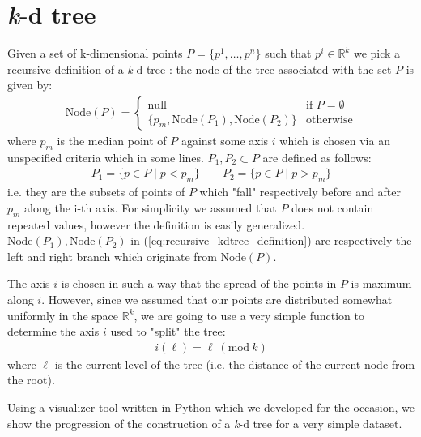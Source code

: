 \documentclass{article}
\newcommand{\kdtree}{\emph{k}-d tree}
\newcommand{\Mod}[1]{\ (\mathrm{mod}\ #1)}
\begin{document}
\section{\kdtree{}}
Given a set of k-dimensional points $P = \{p^1, \dots, p^n\}$ such that
$p^i \in \mathbb{R}^k$ we pick a recursive definition of a \kdtree{}
\cite{skrodzki2019kd}: the node of the tree associated with the set $P$ is given
by:
\begin{gather} \label{eq:recursive_kdtree_definition}
    \text{Node}(P) = \begin{cases}
        \text{null} &\text{if } P = \emptyset\\
        \{p_m, \text{Node}(P_1), \text{Node}(P_2)\} &\text{otherwise}
    \end{cases}
\end{gather}
where $p_m$ is the median point of $P$ against some axis $i$ which is chosen
via an unspecified criteria which in some lines. $P_1, P_2 \subset P$ are
defined as follows:
\begin{gather*}
    P_1 = \{p \in P \mid p < p_m\} \qquad P_2 = \{p \in P \mid p > p_m\}
\end{gather*}
i.e. they are the subsets of points of $P$ which "fall" respectively before
and after $p_m$ along the i-th axis. For simplicity we assumed that $P$ does not
contain repeated values, however the definition is easily generalized.
$\text{Node}(P_1), \text{Node}(P_2)$ in (\ref*{eq:recursive_kdtree_definition})
are respectively the left and right branch which originate from
$\text{Node}(P)$.

The axis $i$ is chosen in such a way that the spread of the points in $P$ is
maximum along $i$. However, since we assumed that our points are distributed
somewhat uniformly in the space $\mathbb{R}^k$, we are going to use a very
simple function to determine the axis $i$ used to "split" the tree:
\begin{gather} \label{eq:axis_criteria}
    i(\ell) = \ell \Mod{k}
\end{gather}
where $\ell$ is the current level of the tree (i.e. the distance of the current
node from the root).

Using a
\href{https://github.com/fAndreuzzi/parallel-kd-tree/tree/master/visualization}{visualizer tool}
written in Python which we developed for the occasion, we show the progression
of the construction of a \kdtree{} for a very simple dataset.
\end{document}
